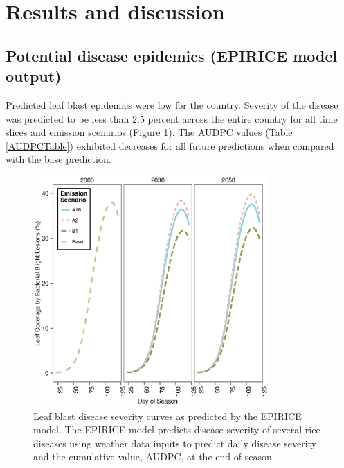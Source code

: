 \documentclass[preprint,12pt]{elsarticle}
\begin{document}
\section{Results and discussion}

\subsection{Potential disease epidemics (EPIRICE model output)}
Predicted leaf blast epidemics were low for the country. Severity of the disease was predicted to be less than 2.5 percent across the entire country for all time slices and emission scenarios (Figure \ref{LBCurves}). The AUDPC values (Table \ref{AUDPCTable}) exhibited decreases for all future predictions when compared with the base prediction.

\begin{figure}[H]
  \includegraphics[width = 90mm]{figures/LB}
  \caption{Leaf blast disease severity curves as predicted by the EPIRICE model. The EPIRICE model predicts disease severity of several rice diseases using weather data inputs to predict daily disease severity and the cumulative value, AUDPC, at the end of season.}
    \label{LBCurves}
\end{figure}
\end{document}
